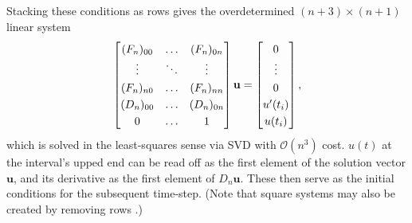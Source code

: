 \documentclass[10pt]{article}
\newcommand{\be}{\begin{equation}}
\newcommand{\ee}{\end{equation}}
\newcommand{\eg}{{\it e.g.\ }}
\newcommand{\mbf}[1]{{\mathbf #1}}
\newcommand{\bigO}{{\mathcal O}}
\begin{document}
Stacking these conditions as rows gives the overdetermined $(n+3) \times (n+1)$ linear system
\be\label{discreteodeic}
\renewcommand*{\arraystretch}{1.25}
\begin{bmatrix}
    (F_n)_{00} & \ldots & (F_n)_{0n} \\
    \vdots & \ddots & \vdots \\
    (F_n)_{n0} & \ldots & (F_n)_{nn} \\
    (D_n)_{00} & \ldots & (D_n)_{0n} \\
    0 & \ldots & 1
\end{bmatrix}
\mbf{u} =  
\begin{bmatrix}
0 \\
\vdots \\
0 \\
u'(t_i) \\
u(t_i)
\end{bmatrix},
\ee
which is solved in the least-squares sense via SVD with $\bigO(n^3)$ cost.
$u(t)$ at the interval's upped end can be read off as the first element of the
solution vector $\mbf{u}$, and its derivative as the first element of
$D_n\mbf{u}$.
These then serve as the initial conditions for the subsequent time-step.
(Note that square systems may also be created by removing rows \cite{tref}.)
\end{document}
